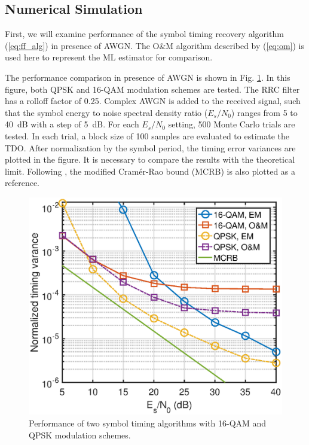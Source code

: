\documentclass[journal,comsoc, onecolumn, 12pt,draftclsnofoot]{IEEEtran} %
\begin{document}
\subsection{Numerical Simulation}
\label{sec:per_sim}
First, we will examine performance of the symbol timing recovery algorithm (\ref{eq:ff_alg}) in presence of AWGN.
The O\&M algorithm
described by (\ref{eq:om})
is used here to represent the ML estimator for comparison.

The performance comparison in presence of AWGN is shown in Fig. \ref{fig:timing_per}.
In this figure, both QPSK and 16-QAM modulation schemes are tested.
The RRC filter has a rolloff factor of 0.25. 
Complex AWGN is added to the received signal, such that the symbol energy to noise spectral density ratio (\(E_s/N_0\)) ranges from 5 to 40~dB with a step of 5~dB.
For each \(E_s/N_0\) setting, 500 Monte Carlo trials are tested.
In each trial, a block size of 100 samples are evaluated to estimate the TDO.
After normalization by the symbol period, the timing error variances are plotted in the figure.
It is necessary to compare the results with the theoretical limit.
Following \cite{mengali1997synchronization}, the modified Cram\'er-Rao bound (MCRB) is also plotted as a reference.

\begin{figure}[ht]
\centering
\includegraphics[width=3 in]{pic/per_timing.eps}
\caption{Performance of two symbol timing algorithms with 16-QAM and QPSK modulation schemes.}
\label{fig:timing_per} 
\end{figure}   
\end{document}
